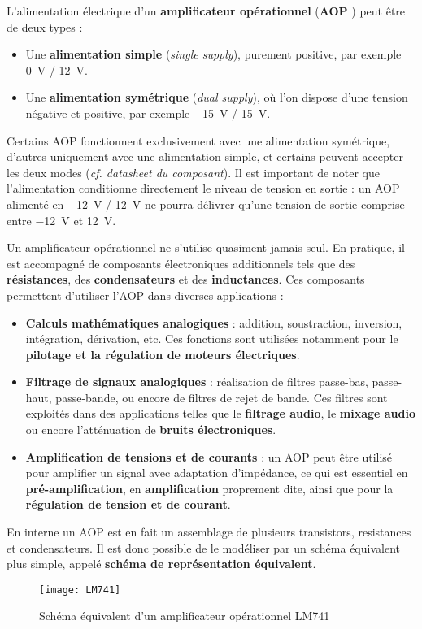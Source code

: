 L'alimentation électrique d'un \textbf{amplificateur opérationnel} (\textbf{AOP}
) peut être de deux types :
\begin{itemize}
    \item Une \textbf{alimentation simple} (\textit{single supply}), purement positive, par exemple \SI{0}{\volt} / \SI{+12}{\volt}.
    \item Une \textbf{alimentation symétrique} (\textit{dual supply}), où l'on dispose d'une tension négative et positive, par exemple \SI{-15}{\volt} / \SI{+15}{\volt}.
\end{itemize}

Certains AOP fonctionnent exclusivement avec une alimentation symétrique, 
d'autres uniquement avec une alimentation simple, et certains peuvent accepter 
les deux modes (\textit{cf. datasheet du composant}). Il est important de noter 
que l'alimentation conditionne directement le niveau de tension en sortie : un 
AOP alimenté en \SI{-12}{\volt} / \SI{+12}{\volt} ne pourra délivrer qu'une 
tension de sortie comprise entre \SI{-12}{\volt} et \SI{+12}{\volt}.

Un amplificateur opérationnel ne s'utilise quasiment jamais seul. En pratique, 
il est accompagné de composants électroniques additionnels tels que des 
\textbf{résistances}, des \textbf{condensateurs} et des \textbf{inductances}. 
Ces composants permettent d'utiliser l'AOP dans diverses applications :
\begin{itemize}
    \item \textbf{Calculs mathématiques analogiques} : addition, soustraction, inversion, intégration, dérivation, etc. Ces fonctions sont utilisées notamment pour le \textbf{pilotage et la régulation de moteurs électriques}.
    \item \textbf{Filtrage de signaux analogiques} : réalisation de filtres passe-bas, passe-haut, passe-bande, ou encore de filtres de rejet de bande. Ces filtres sont exploités dans des applications telles que le \textbf{filtrage audio}, le \textbf{mixage audio} ou encore l'atténuation de \textbf{bruits électroniques}.
    \item \textbf{Amplification de tensions et de courants} : un AOP peut être utilisé pour amplifier un signal avec adaptation d'impédance, ce qui est essentiel en \textbf{pré-amplification}, en \textbf{amplification} proprement dite, ainsi que pour la \textbf{régulation de tension et de courant}.
\end{itemize}

En interne un AOP est en fait un assemblage de plusieurs transistors, resistances et condensateurs. 
Il est donc possible de le modéliser par un schéma équivalent plus simple, 
appelé \textbf{schéma de représentation équivalent}.
\begin{figure}[H]
    \centering
    \texttt{[image: LM741]}
    \caption{
        Schéma équivalent d'un amplificateur opérationnel LM741
    }
    \label{fig:opamp-equivalent}
\end{figure}